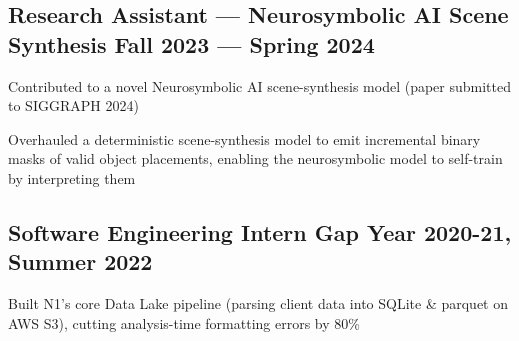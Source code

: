 \documentclass[letter,10pt]{article}
\begin{document}
\subsection{{Research Assistant — Neurosymbolic AI Scene Synthesis \hfill Fall 2023 — Spring 2024}}
\begin{zitemize}
\item Contributed to a novel Neurosymbolic AI scene-synthesis model (paper submitted to SIGGRAPH 2024)
\item Overhauled a deterministic scene-synthesis model to emit incremental binary masks of valid object placements, enabling the neurosymbolic model to self-train by interpreting them
\end{zitemize}


\subsection{{Software Engineering Intern \hfill Gap Year 2020-21, Summer 2022}}
\begin{zitemize}
\item Built N1's core Data Lake pipeline (parsing client data into SQLite \& parquet on AWS S3), cutting analysis-time formatting errors by 80\%
\end{zitemize}

\end{document}
